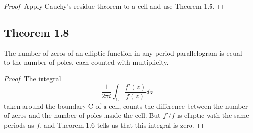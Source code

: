 \begin{proof}
    Apply Cauchy's residue theorem to a cell and use Theorem 1.6.
\end{proof}


\subsection*{Theorem 1.8}

\begin{proposition}[]
    The number of zeros of an elliptic function in any period parallelogram is equal to the number of poles,
    each counted with multiplicity.
\end{proposition}

\begin{proof}
    The integral
    \[
        \frac{1}{2 \pi i} \int_C \frac{f'(z)}{f(z)} dz
    \]
    taken around the boundary C of a cell, counts the difference between the number of zeros and the number of poles
    inside the cell. But $f'/f$ is elliptic with the same periods as $f$, and Theorem 1.6 tells us that this integral
    is zero.
\end{proof}
